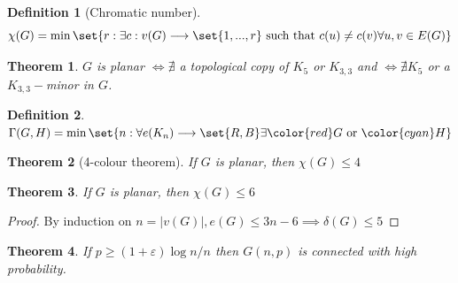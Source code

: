 \documentclass[english, dark, index]{Iart}
\newtheorem{theorem}{Theorem}[part]
\newtheorem{definition}{Definition}[part]
\begin{document}
	\begin{definition}[Chromatic number]
		\[ \chi(G)=\min\set{r:\exists c:v(G)\longrightarrow\set{1,...,r}\textup{ such that }c(u)\neq c(v)\forall u,v\in E(G)} \]
	\end{definition}

	\begin{theorem}
		$ G $ is planar $ \iff \nexists $ a topological copy of $ K_5 $ or $ K_{3,3} $
		and $ \iff \nexists K_5 $ or a $ K_{3,3}- $minor in $ G $.
	\end{theorem}

	
	\begin{definition}
		$ \Gamma(G,H)=\min\set{n:\forall e(K_n)\longrightarrow \set{R,B}\exists {\color{red} G} \textup{ or }{\color{cyan} H}} $
	\end{definition}

	\begin{theorem}[4-colour theorem]
		If $ G $ is planar, then $ \chi(G)\leqslant 4 $
	\end{theorem}
		
	\begin{theorem}
		If $ G $ is planar, then $ \chi(G)\leqslant 6 $
	\end{theorem}

	\begin{proof}
		By induction on $ n=|v(G)|,e(G)\leqslant 3n-6\implies \delta(G)\leqslant 5 $
	\end{proof}


	\begin{theorem}
		If $ p\geqslant (1+\varepsilon)\log n/n $ then $ G(n,p) $ is connected with high probability.
	\end{theorem}
	
\end{document}
